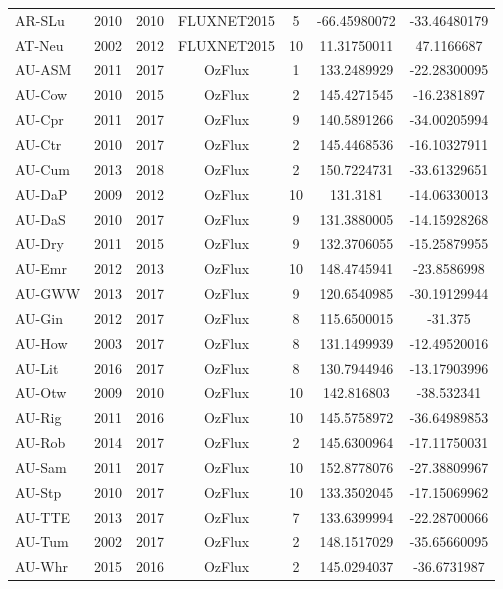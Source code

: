 \begin{center}
\begin{longtable}{lcccccc}
AR-SLu & 2010 & 2010 & FLUXNET2015 & 5      & -66.45980072 & -33.46480179 \\
AT-Neu & 2002 & 2012 & FLUXNET2015 & 10     & 11.31750011  & 47.1166687   \\
AU-ASM & 2011 & 2017 & OzFlux      & 1      & 133.2489929  & -22.28300095 \\
AU-Cow & 2010 & 2015 & OzFlux      & 2      & 145.4271545  & -16.2381897  \\
AU-Cpr & 2011 & 2017 & OzFlux      & 9      & 140.5891266  & -34.00205994 \\
AU-Ctr & 2010 & 2017 & OzFlux      & 2      & 145.4468536  & -16.10327911 \\
AU-Cum & 2013 & 2018 & OzFlux      & 2      & 150.7224731  & -33.61329651 \\
AU-DaP & 2009 & 2012 & OzFlux      & 10     & 131.3181     & -14.06330013 \\
AU-DaS & 2010 & 2017 & OzFlux      & 9      & 131.3880005  & -14.15928268 \\
AU-Dry & 2011 & 2015 & OzFlux      & 9      & 132.3706055  & -15.25879955 \\
AU-Emr & 2012 & 2013 & OzFlux      & 10     & 148.4745941  & -23.8586998  \\
AU-GWW & 2013 & 2017 & OzFlux      & 9      & 120.6540985  & -30.19129944 \\
AU-Gin & 2012 & 2017 & OzFlux      & 8      &  115.6500015  & -31.375      \\
AU-How & 2003 & 2017 & OzFlux      & 8      & 131.1499939  & -12.49520016 \\
AU-Lit & 2016 & 2017 & OzFlux      & 8      & 130.7944946  & -13.17903996 \\
AU-Otw & 2009 & 2010 & OzFlux      & 10     & 142.816803   & -38.532341   \\
AU-Rig & 2011 & 2016 & OzFlux      & 10     & 145.5758972  & -36.64989853 \\
AU-Rob & 2014 & 2017 & OzFlux      & 2      & 145.6300964  & -17.11750031 \\
AU-Sam & 2011 & 2017 & OzFlux      & 10     & 152.8778076  & -27.38809967 \\
AU-Stp & 2010 & 2017 & OzFlux      & 10     & 133.3502045  & -17.15069962 \\
AU-TTE & 2013 & 2017 & OzFlux      & 7      & 133.6399994  & -22.28700066 \\
AU-Tum & 2002 & 2017 & OzFlux      & 2      & 148.1517029  & -35.65660095 \\
AU-Whr & 2015 & 2016 & OzFlux      & 2      & 145.0294037  & -36.6731987  \\

\end{longtable}
\end{center}
